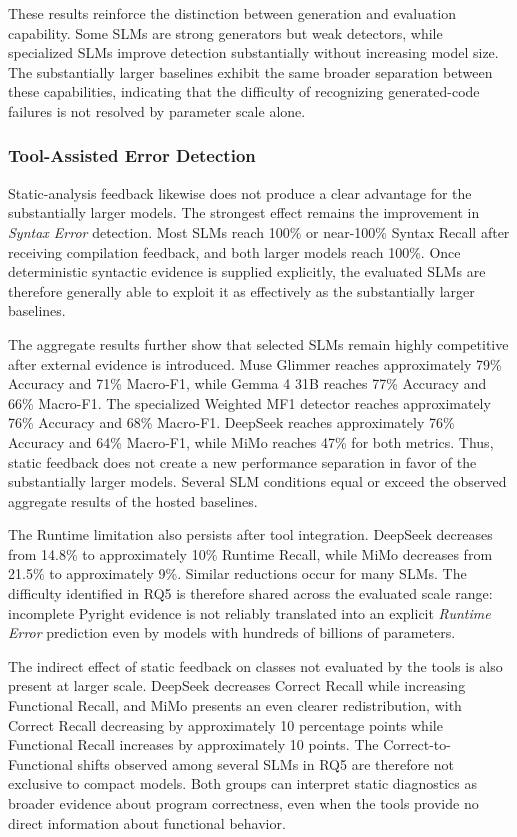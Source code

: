 These results reinforce the distinction between generation and evaluation capability. Some SLMs are strong generators but weak detectors, while specialized SLMs improve detection substantially without increasing model size. The substantially larger baselines exhibit the same broader separation between these capabilities, indicating that the difficulty of recognizing generated-code failures is not resolved by parameter scale alone.

\subsubsection{Tool-Assisted Error Detection}

Static-analysis feedback likewise does not produce a clear advantage for the substantially larger models. The strongest effect remains the improvement in \emph{Syntax Error} detection. Most SLMs reach 100\% or near-100\% Syntax Recall after receiving compilation feedback, and both larger models reach 100\%. Once deterministic syntactic evidence is supplied explicitly, the evaluated SLMs are therefore generally able to exploit it as effectively as the substantially larger baselines.

The aggregate results further show that selected SLMs remain highly competitive after external evidence is introduced. Muse Glimmer reaches approximately 79\% Accuracy and 71\% Macro-F1, while Gemma 4 31B reaches 77\% Accuracy and 66\% Macro-F1. The specialized Weighted MF1 detector reaches approximately 76\% Accuracy and 68\% Macro-F1. DeepSeek reaches approximately 76\% Accuracy and 64\% Macro-F1, while MiMo reaches 47\% for both metrics. Thus, static feedback does not create a new performance separation in favor of the substantially larger models. Several SLM conditions equal or exceed the observed aggregate results of the hosted baselines.

The Runtime limitation also persists after tool integration. DeepSeek decreases from 14.8\% to approximately 10\% Runtime Recall, while MiMo decreases from 21.5\% to approximately 9\%. Similar reductions occur for many SLMs. The difficulty identified in RQ5 is therefore shared across the evaluated scale range: incomplete Pyright evidence is not reliably translated into an explicit \emph{Runtime Error} prediction even by models with hundreds of billions of parameters.

The indirect effect of static feedback on classes not evaluated by the tools is also present at larger scale. DeepSeek decreases Correct Recall while increasing Functional Recall, and MiMo presents an even clearer redistribution, with Correct Recall decreasing by approximately 10 percentage points while Functional Recall increases by approximately 10 points. The Correct-to-Functional shifts observed among several SLMs in RQ5 are therefore not exclusive to compact models. Both groups can interpret static diagnostics as broader evidence about program correctness, even when the tools provide no direct information about functional behavior.

